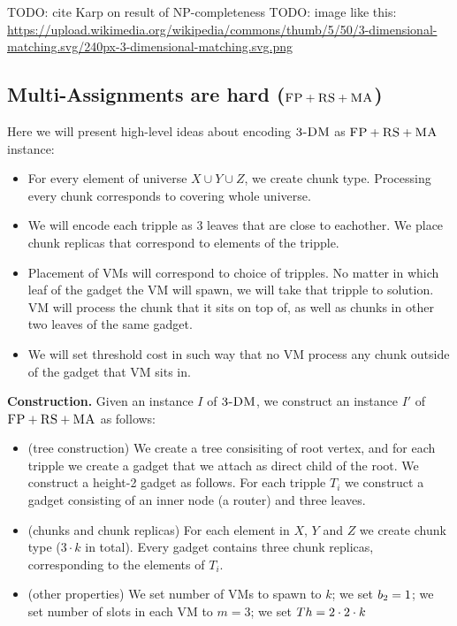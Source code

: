 TODO: cite Karp on result of NP-completeness
TODO: image like this: \url{https://upload.wikimedia.org/wikipedia/commons/thumb/5/50/3-dimensional-matching.svg/240px-3-dimensional-matching.svg.png}

\subsection{Multi-Assignments are hard ($\textsc{FP}+\textsc{RS}+\textsc{MA}$)}\label{ssec:fprsma}

Here we will present high-level ideas about encoding $\textsc{3-DM}$ as
 $\textsc{FP}+\textsc{RS}+\textsc{MA}$ instance:

 \begin{itemize} \item For every element of universe $X\cup Y\cup
 Z$, we create chunk type. Processing every chunk corresponds to
 covering whole universe.

 \item We will encode each tripple as $3$ leaves that are close to
 eachother. We place chunk replicas that correspond to elements of the
 tripple.

 \item Placement of VMs will correspond to choice of tripples. No
 matter in which leaf of the gadget the VM will spawn, we will take
 that tripple to solution. VM will process the chunk that it sits on
 top of, as well as chunks in other two leaves of the same gadget.
 
\item We will set threshold cost in such way that no VM process
any chunk outside of the gadget that VM sits in.
\end{itemize}

\textbf{Construction.}
Given an instance $I$ of $\textsc{3-DM}$, we construct an instance $I'$ of
$\textsc{FP}+\textsc{RS}+\textsc{MA}$ as follows:
\begin{itemize}
\item (tree construction) We create a tree consisiting of root vertex,
and for each tripple we create a gadget that we attach as direct child
of the root. We construct a height-2 gadget
as follows. For each tripple $T_i$ we construct a gadget
consisting of an inner node (a router) and three leaves.
\item (chunks and chunk replicas) For each element in $X$, $Y$ and $Z$ we create chunk type
($3 \cdot k$ in total). Every gadget
contains three chunk replicas, corresponding to the elements of $T_i$.
\item (other properties) We set number of VMs to spawn to $k$; we set
$b_2=1$; we set number of slots in each VM to $m=3$; we set
$Th=2 \cdot 2 \cdot k$
\end{itemize}

